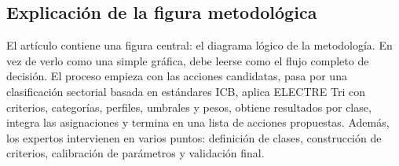 \documentclass[11pt,a4paper]{article}
\begin{document}
\subsection{Explicación de la figura metodológica}

El artículo contiene una figura central: el diagrama lógico de la metodología. En vez de verlo como una simple gráfica, debe leerse como el flujo completo de decisión. El proceso empieza con las acciones candidatas, pasa por una clasificación sectorial basada en estándares ICB, aplica ELECTRE Tri con criterios, categorías, perfiles, umbrales y pesos, obtiene resultados por clase, integra las asignaciones y termina en una lista de acciones propuestas. Además, los expertos intervienen en varios puntos: definición de clases, construcción de criterios, calibración de parámetros y validación final.
\end{document}
